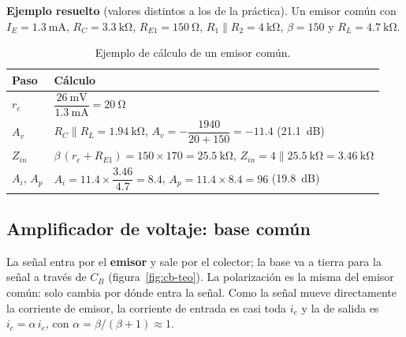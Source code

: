 \documentclass[11pt,a4paper]{article}
\newcommand{\pll}{\mathbin{\|}}
\let\needspace\Needspace
\begin{document}
\needspace{14\baselineskip}
\noindent\textbf{Ejemplo resuelto} (valores distintos a los de la práctica). Un emisor común
con $I_E = \qty{1.3}{\milli\ampere}$, $R_C = \qty{3.3}{\kilo\ohm}$,
$R_{E1} = \qty{150}{\ohm}$, $R_1 \pll R_2 = \qty{4}{\kilo\ohm}$, $\beta = 150$ y
$R_L = \qty{4.7}{\kilo\ohm}$.
\begin{table}[H]
  \centering
  \renewcommand{\arraystretch}{2.1}
  \begin{tabularx}{\linewidth}{|>{\centering\arraybackslash}m{2.4cm}|>{\centering\arraybackslash}X|}
    \hline
    \textbf{Paso} & \textbf{Cálculo} \\ \hline
    $r_e$ & $\dfrac{\qty{26}{\milli\volt}}{\qty{1.3}{\milli\ampere}} = \qty{20}{\ohm}$ \\ \hline
    $A_v$ & $R_C \pll R_L = \qty{1.94}{\kilo\ohm}$, \qquad
            $A_v = -\dfrac{1940}{20 + 150} = \num{-11.4}$ \quad (\qty{21.1}{dB}) \\ \hline
    $Z_{in}$ & $\beta\,(r_e + R_{E1}) = 150 \times 170 = \qty{25.5}{\kilo\ohm}$, \qquad
               $Z_{in} = \num{4} \pll \qty{25.5}{\kilo\ohm} = \qty{3.46}{\kilo\ohm}$ \\ \hline
    $A_i$, $A_p$ & $A_i = \num{11.4} \times \dfrac{\num{3.46}}{\num{4.7}} = \num{8.4}$, \qquad
                   $A_p = \num{11.4} \times \num{8.4} = 96$ \quad (\qty{19.8}{dB}) \\ \hline
  \end{tabularx}
  \caption{Ejemplo de cálculo de un emisor común.}
  \label{tab:ejemplo}
\end{table}

\subsection{Amplificador de voltaje: base común}
La señal entra por el \textbf{emisor} y sale por el colector; la base va a tierra para la
señal a través de $C_B$ (figura~\ref{fig:cb-teo}). La polarización es la misma del emisor
común: solo cambia por dónde entra la señal. Como la señal mueve directamente la corriente de
emisor, la corriente de entrada es casi toda $i_e$ y la de salida es $i_c = \alpha\,i_e$, con
$\alpha = \beta/(\beta + 1) \approx 1$.
\end{document}
